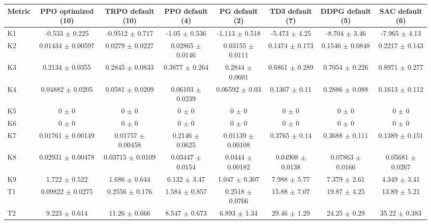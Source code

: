 \begin{tabular}{lccccccc}
\toprule
Metric & PPO optimized (10) & TRPO default (10) & PPO default (4) & PG default (2) & TD3 default (7) & DDPG default (5) & SAC default (6) \\
\midrule
K1 & -0.533 $\pm$ 0.225 & -0.9512 $\pm$ 0.717 & -1.05 $\pm$ 0.536 & -1.113 $\pm$ 0.518 & -5.473 $\pm$ 4.25 & -8.704 $\pm$ 3.46 & -7.965 $\pm$ 4.13 \\
K2 & 0.01434 $\pm$ 0.00597 & 0.0279 $\pm$ 0.0227 & 0.02865 $\pm$ 0.0146 & 0.03155 $\pm$ 0.0111 & 0.1474 $\pm$ 0.173 & 0.1546 $\pm$ 0.0848 & 0.2217 $\pm$ 0.143 \\
K3 & 0.2134 $\pm$ 0.0355 & 0.2845 $\pm$ 0.0833 & 0.3877 $\pm$ 0.264 & 0.2844 $\pm$ 0.0601 & 0.6861 $\pm$ 0.289 & 0.7054 $\pm$ 0.226 & 0.8971 $\pm$ 0.277 \\
K4 & 0.04882 $\pm$ 0.0205 & 0.0581 $\pm$ 0.0209 & 0.06103 $\pm$ 0.0239 & 0.06592 $\pm$ 0.03 & 0.1367 $\pm$ 0.11 & 0.2886 $\pm$ 0.088 & 0.1613 $\pm$ 0.112 \\
K5 & 0 $\pm$ 0 & 0 $\pm$ 0 & 0 $\pm$ 0 & 0 $\pm$ 0 & 0 $\pm$ 0 & 0 $\pm$ 0 & 0 $\pm$ 0 \\
K6 & 0 $\pm$ 0 & 0 $\pm$ 0 & 0 $\pm$ 0 & 0 $\pm$ 0 & 0 $\pm$ 0 & 0 $\pm$ 0 & 0 $\pm$ 0 \\
K7 & 0.01761 $\pm$ 0.00149 & 0.01757 $\pm$ 0.00458 & 0.2146 $\pm$ 0.0625 & 0.01139 $\pm$ 0.00108 & 0.3765 $\pm$ 0.14 & 0.3688 $\pm$ 0.111 & 0.1389 $\pm$ 0.151 \\
K8 & 0.02931 $\pm$ 0.00478 & 0.03715 $\pm$ 0.0109 & 0.03447 $\pm$ 0.0154 & 0.0444 $\pm$ 0.00182 & 0.04908 $\pm$ 0.0138 & 0.07863 $\pm$ 0.0166 & 0.05681 $\pm$ 0.0267 \\
K9 & 1.722 $\pm$ 0.522 & 1.686 $\pm$ 0.644 & 6.132 $\pm$ 3.47 & 1.047 $\pm$ 0.307 & 7.988 $\pm$ 5.77 & 7.379 $\pm$ 2.61 & 4.349 $\pm$ 3.41 \\
T1 & 0.09822 $\pm$ 0.0275 & 0.2556 $\pm$ 0.176 & 1.584 $\pm$ 0.857 & 0.2518 $\pm$ 0.0766 & 15.88 $\pm$ 7.07 & 19.87 $\pm$ 4.25 & 13.89 $\pm$ 5.21 \\
T2 & 9.223 $\pm$ 0.614 & 11.26 $\pm$ 0.666 & 8.547 $\pm$ 0.673 & 6.893 $\pm$ 1.34 & 29.46 $\pm$ 1.29 & 24.25 $\pm$ 0.29 & 35.22 $\pm$ 0.383 \\
\bottomrule
\end{tabular}
